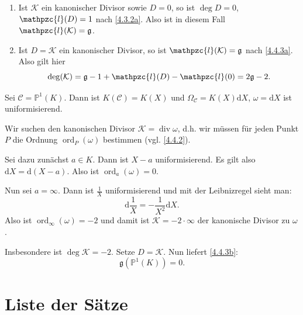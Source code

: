 \documentclass[a4paper,12pt,index=toc]{scrbook}
\theoremstyle{keinenummern} %
\def\CC{\mathcal{C}}
\def\P{\mathbb{P}}
\renewcommand{\d}{\mathrm{d}}
\newcommand{\K}{\mathcal{K}}
\newcommand{\g}{\mathfrak{g}}
\def\ll{\mathpzc{l}}
\renewcommand{\div}{\operatorname{div}}
\newcommand{\ord}{\operatorname{ord}}
\begin{document}
\begin{kor}\label{4.4.3} \begin{enumerate}
  \item{} Ist $\K$ ein kanonischer Divisor sowie $D=0$, so ist $\deg D=0$, $\ll(D)=1$ nach \cref{4.3.2a}. Also ist in diesem Fall $\ll(\K)=\g$.
  \item{} Ist $D=\K$ ein kanonischer Divisor, so ist $\ll(\K)=\g$ nach \ref{4.4.3a}. Also gilt hier \[\deg (\K)=\g-1+\ll(D)-\ll(0)=2\g-2.\]
 \end{enumerate}
\end{kor}
\begin{bsp}\label{4.4.4}
Sei $\CC=\P^1(K)$. Dann ist $K(\CC)=K(X)$ und $\Omega_{\CC}=K(X)\d X$, $\omega=\d X$ ist uniformisierend.

Wir suchen den kanonischen Divisor $\K=\div \omega$, d.h. wir müssen für jeden Punkt $P$ die Ordnung $\ord_P(\omega)$ bestimmen (vgl. \cref{4.4.2}).

Sei dazu zunächst $a\in K$. Dann ist $X-a$ uniformisierend. Es gilt also $\d X=\d (X-a)$. Also ist $\ord_a (\omega)=0$.

Nun sei $a=\infty$. Dann ist $\frac{1}{X}$ uniformisierend und mit der Leibnizregel sieht man: \[\d\frac{1}{X}=-\frac{1}{X^2} \d X.\]
Also ist $\ord_{\infty}(\omega)=-2$ und damit ist $\K=-2\cdot \infty$ der kanonische Divisor zu $\omega$. 

Insbesondere ist $\deg \K=-2$. Setze $D=\K$. Nun liefert \cref{4.4.3b}: \[\g(\P^1(K))=0.\] 
\end{bsp}

\chapter{Liste der Sätze}


\renewcommand\indexname{Stichwortverzeichnis}
\printindex
\end{document}
